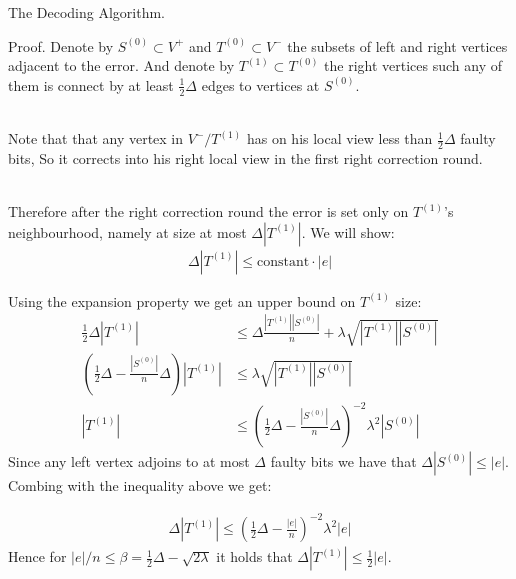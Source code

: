 \documentclass{beamer}
\begin{document}
\begin{frame}{The Decoding Algorithm.}
  \begin{block}{Proof.}
  Denote by $S^{(0)} \subset V^{+}$ and  $T^{(0)} \subset V^{-}$ the subsets of left and right vertices adjacent to the error. And denote by $T^{(1)} \subset T^{(0)}$ the right vertices such any of them is connect by at least $\frac{1}{2}\Delta$ edges to vertices at $S^{(0)}$. \\~\

  Note that that any vertex in $V^{-}/T^{(1)}$ has on his local view less than $\frac{1}{2}\Delta$ faulty bits, So it corrects into his right local view in the first right correction round. \\~\

  Therefore after the right correction round the error is set only on $T^{(1)}$'s neighbourhood, namely at size at most $\Delta|T^{(1)}|$. We will show:
  \begin{equation*}
    \begin{split}
  \Delta|T^{(1)}| \le \text{constant} \cdot |e|
    \end{split}
  \end{equation*}
\end{block}
\end{frame}
\begin{frame}

  Using the expansion property we get an upper bound on $T^{(1)}$ size: \begin{equation*}
  \begin{split} 
    \frac{1}{2}\Delta |T^{(1)}| & \le \Delta \frac{|T^{(1)}||S^{(0)}|}{n} + \lambda\sqrt{|T^{(1)}||S^{(0)}|} \\ 
  \left( \frac{1}{2}  \Delta - \frac{|S^{(0)}|}{n} \Delta \right) |T^{(1)}| & \le \lambda \sqrt{|T^{(1)}||S^{(0)}|} \\ 
|T^{(1)}| & \le \left( \frac{1}{2}  \Delta - \frac{|S^{(0)}|}{n} \Delta \right)^{-2}\lambda^{2} |S^{(0)}| 
  \end{split}
\end{equation*}
Since any left vertex adjoins to at most $\Delta$ faulty bits we have that $\Delta|S^{(0)}| \le |e|$. Combing with the inequality above we get:  

\begin{equation*}
  \begin{split}
    \Delta |T^{(1)}| \le \left( \frac{1}{2}  \Delta - \frac{|e|}{n} \right)^{-2}\lambda^{2} |e|
  \end{split}
\end{equation*}
Hence for $|e|/n \le \beta =  \frac{1}{2}  \Delta - \sqrt{2\lambda}$ it holds that $\Delta|T^{(1)}| \le \frac{1}{2}|e|$. 




\end{frame}
\end{document}
